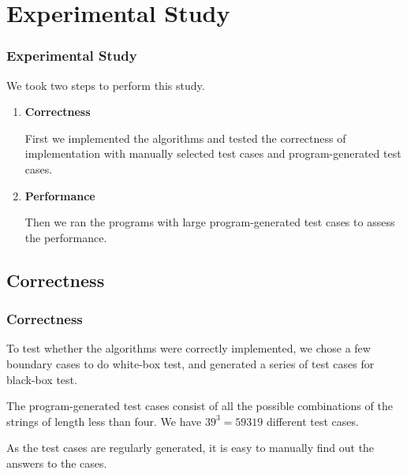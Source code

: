 \documentclass[10pt]{beamer}
\begin{document}
\section{Experimental Study}
\begin{frame}
  \frametitle{Experimental Study}
We took two steps to perform this study. 
  \begin{enumerate}
    \item<1-> \textbf{Correctness}

First we implemented the algorithms and tested the correctness of implementation with manually selected test cases and program-generated test cases. 
    \item<2-> \textbf{Performance}

Then we ran the programs with large program-generated test cases to assess the performance.
  \end{enumerate}
\end{frame}

\subsection{Correctness}
\begin{frame}
  \frametitle{Correctness}
To test whether the algorithms were correctly implemented, we chose a few boundary cases to do white-box test, and generated a series of test cases for black-box test.

  \medskip
  \medskip

The program-generated test cases consist of all the possible combinations of the strings of length less than four. We have $39^3=59319$ different test cases. 

  \medskip
  \medskip

As the test cases are regularly generated, it is easy to manually find out the answers to the cases. 

\end{frame}
\end{document}
